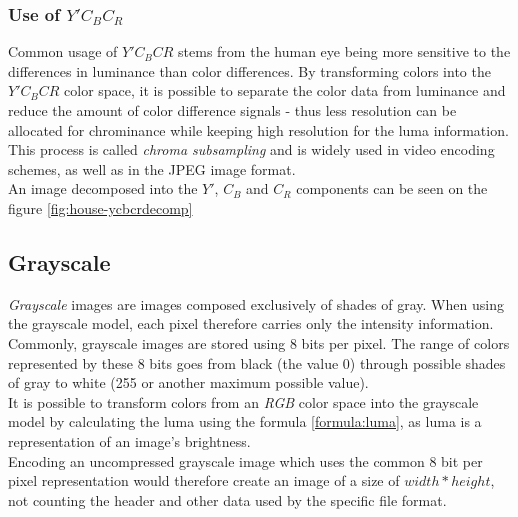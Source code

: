 \documentclass[thesis=M,english]{FITthesis}[2012/10/20]
\begin{document}
\subsubsection{Use of $Y'C_{B}C_{R}$}
Common usage of $Y'C_{B}C{R}$ stems from the human eye being more sensitive to the
differences in luminance than color differences. By transforming colors into the $Y'C_{B}C{R}$
color space, it is possible to separate the color data from luminance and reduce the
amount of color difference signals - thus less resolution can be allocated for chrominance while
keeping high resolution for the luma information. This process is called \emph{chroma
subsampling} and is widely used in video encoding schemes, as well as in the JPEG image
format. \cite{img:chroma-subsample}
\\

An image decomposed into the $Y'$, $C_B$ and $C_R$ components can be seen on the figure
\ref{fig:house-ycbcrdecomp}


\subsection{Grayscale}
\emph{Grayscale} images are images composed exclusively of shades of gray.
When using the grayscale model, each pixel therefore carries only the intensity
information. Commonly, grayscale images are stored using 8 bits per pixel.
The range of colors represented by these 8 bits goes from black (the value 0)
through possible shades of gray to white (255 or another maximum possible value).
\\

It is possible to transform colors from an \emph{RGB} color space into
the grayscale model by calculating the luma using the formula \ref{formula:luma},
as luma is a representation of an image's brightness.
\\

Encoding an uncompressed grayscale image which uses the common 8 bit per pixel
representation would therefore create an image of a size of $width*height$, not counting
the header and other data used by the specific file format.
\end{document}
